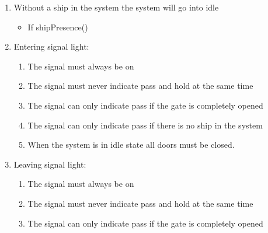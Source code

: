 \begin{enumerate}
\begin{itemize}
	\end{itemize}
	
	\item Without a ship in the system the system will go into idle
	\begin{itemize}
		\item If shipPresence()
		
		
	\end{itemize}
	
	
	\item Entering signal light:
		\begin{enumerate}
			\item The signal must always be on
			\item The signal must never indicate pass and hold at the same time
			\item The signal can only indicate pass if the gate is completely opened
			\item The signal can only indicate pass if there is no ship in the system
			\item When the system is in idle state all doors must be closed.
			
		\end{enumerate}
	\item Leaving signal light:
		\begin{enumerate}
			\item The signal must always be on
			\item The signal must never indicate pass and hold at the same time
			\item The signal can only indicate pass if the gate is completely opened
		\end{enumerate}
\end{enumerate}
